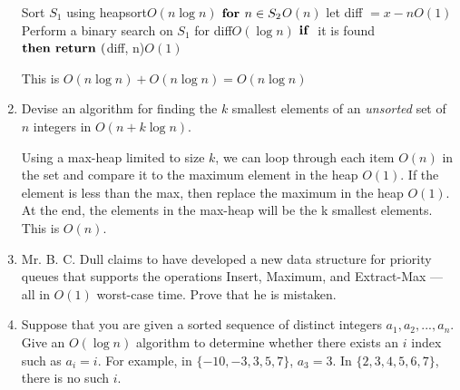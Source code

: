 \documentclass[12pt]{article}
\begin{document}
\begin{enumerate}
    \tabto{1cm}Sort $S_1$ using heapsort\tabto{11cm}$O(n \log n)$
    \tabto{1cm}$\mbox{\bf for\ } n \in S_2$\tabto{11cm}$O(n)$
    \tabto{2cm}let diff $= x-n$\tabto{11cm}$O(1)$
    \tabto{2cm}Perform a binary search on $S_1$ for diff\tabto{11cm}$O(\log n)$
    \tabto{2cm}$\mbox{\bf if\ }$ it is found $\mbox{\bf then\ } \mbox{\bf return\ } ($diff, n)\tabto{11cm}$O(1)$

    This is $O(n \log n) + O(n\log n) = O(n\log n)$

    \item Devise an algorithm for finding the $k$ smallest elements of an \emph{unsorted} set of $n$
    integers in $O(n + k \log n)$.  

    Using a max-heap limited to size $k$, we can loop through each item $O(n)$ in the set and compare it to the
    maximum element in the heap $O(1)$. If the element is less than the max, then replace the maximum in the heap
    $O(1)$. At the end, the elements in the max-heap will be the k smallest elements. This is $O(n)$.

    \item Mr. B. C. Dull claims to have developed a new data structure for priority queues
    that supports the operations Insert, Maximum, and Extract-Max — all in $O(1)$ worst-case time.
    Prove that he is mistaken.

    \item Suppose that you are given a sorted sequence of distinct integers ${a_1, a_2,...,a_n}$.
    Give an $O(\log n)$ algorithm to determine whether there exists an $i$ index such as $a_i = i$.
    For example, in $\{-10, -3, 3, 5, 7\}$, $a_3 = 3$. In $\{2, 3, 4, 5, 6, 7\}$, there is no such $i$.
\end{enumerate}
\end{document}
